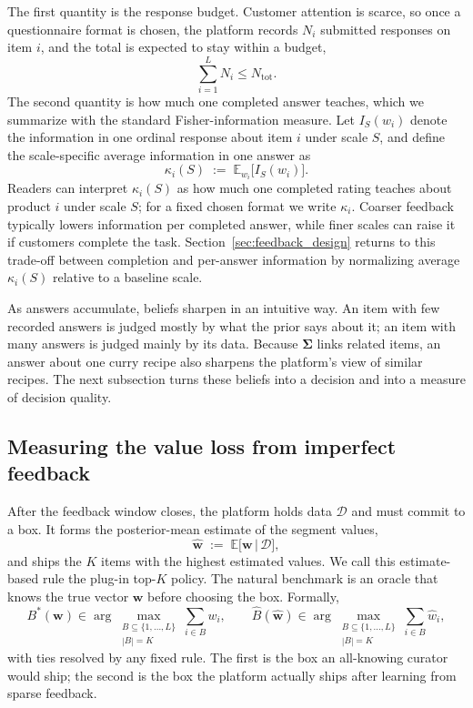 \documentclass[11pt]{article}
\theoremstyle{definition}
\theoremstyle{remark}
\newcommand{\E}{\mathbb{E}}
\newcommand{\1}{\mathbf{1}}
\newcommand{\w}{\mathbf{w}}
\newcommand{\bSigma}{\boldsymbol{\Sigma}}
\begin{document}
The first quantity is the response budget. Customer attention is
scarce, so once a questionnaire format is chosen, the platform records \(N_i\) submitted responses on item \(i\), and the total is expected to stay within a budget,
\[
\sum_{i=1}^L N_i \le N_{\text{tot}}.
\]
The second quantity is how much one completed answer teaches, which we
summarize with the standard Fisher-information measure. Let
\(I_S(w_i)\) denote the information in one ordinal response about item
\(i\) under scale \(S\), and define the scale-specific average
information in one answer as
\[
\kappa_i(S) \;:=\; \E_{w_i}\!\big[I_S(w_i)\big].
\]
Readers can interpret \(\kappa_i(S)\) as how much one completed rating
teaches about product \(i\) under scale \(S\); for a fixed chosen
format we write \(\kappa_i\). Coarser feedback typically lowers
information per completed answer, while finer scales can raise it if
customers complete the task. Section~\ref{sec:feedback_design} returns
to this trade-off between completion and per-answer information by
normalizing average \(\kappa_i(S)\) relative to a baseline scale.

As answers accumulate, beliefs sharpen in an intuitive way. An item
with few recorded answers is judged mostly by what the prior says about
it; an item with many answers is judged mainly by its data. Because
\(\bSigma\) links related items, an answer about one curry recipe also
sharpens the platform's view of similar recipes. The next subsection
turns these beliefs into a decision and into a measure of decision
quality.

\subsection[Measuring value loss]{Measuring the value loss from imperfect feedback}\label{subsec:retention}

After the feedback window closes, the platform holds data
\(\mathcal D\) and must commit to a box. It forms the posterior-mean
estimate of the segment values,
\begin{equation}\label{eq:postmean-def}
\hat{\mathbf w}
\;:=\; \mathbb E\!\big[\mathbf w \,\big|\, \mathcal D\big],
\end{equation}
and ships the \(K\) items with the highest estimated values. We call
this estimate-based rule the plug-in top-\(K\) policy. The natural
benchmark is an oracle that knows the true vector \(\mathbf w\) before
choosing the box. Formally,
\[
B^*(\w) \in
\arg\max_{\substack{B\subseteq\{1,\ldots,L\}\\ |B|=K}}
\sum_{i\in B} w_i,
\qquad
\hat B(\hat{\w}) \in
\arg\max_{\substack{B\subseteq\{1,\ldots,L\}\\ |B|=K}}
\sum_{i\in B} \hat w_i,
\]
with ties resolved by any fixed rule. The first is the box an
all-knowing curator would ship; the second is the box the platform
actually ships after learning from sparse feedback.
\end{document}
